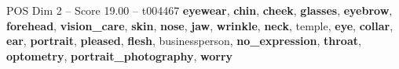 \begin{textsample}{POS Dim 2 – Score 19.00 – t004467}  \label{ex:f2_pos_040}
\textbf{eyewear}, \textbf{chin}, \textbf{cheek}, \textbf{glasses}, \textbf{eyebrow}, \textbf{forehead}, \textbf{vision\_care}, \textbf{skin}, \textbf{nose}, \textbf{jaw}, \textbf{wrinkle}, \textbf{neck}, temple, \textbf{eye}, \textbf{collar}, \textbf{ear}, \textbf{portrait}, \textbf{pleased}, \textbf{flesh}, businessperson, \textbf{no\_expression}, \textbf{throat}, \textbf{optometry}, \textbf{portrait\_photography}, \textbf{worry}

\end{textsample}
